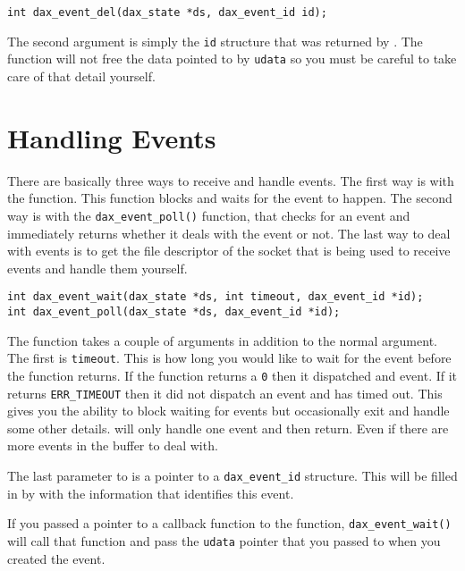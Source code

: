 \begin{verbatim}
int dax_event_del(dax_state *ds, dax_event_id id);
\end{verbatim}

The second argument is simply the \texttt{id} structure that was returned by \eventadd.  The \eventdel function will not free the data pointed to by \texttt{udata} so you must be careful to take care of that detail yourself.

\section{Handling Events}

There are basically three ways to receive and handle events.  The first way is with the \eventwait function.  This function blocks and waits for the event to happen.  The second way is with the \verb|dax_event_poll()| function, that checks for an event and immediately returns whether it deals with the event or not.  The last way to deal with events is to get the file descriptor of the socket that is being used to receive events and handle them yourself.

\begin{verbatim}
int dax_event_wait(dax_state *ds, int timeout, dax_event_id *id);
int dax_event_poll(dax_state *ds, dax_event_id *id);
\end{verbatim}


The \verb|| function takes a couple of arguments in addition to the normal \daxstate argument.  The first is \texttt{timeout}.  This is how long you would like to wait for the event before the function returns.  If the function returns a \verb|0| then it dispatched and event.  If it returns \texttt{ERR\_TIMEOUT} then it did not dispatch an event and has timed out.  This gives you the ability to block waiting for events but occasionally exit and handle some other details.  \eventwait will only handle one event and then return.  Even if there are more events in the buffer to deal with.

The last parameter to \eventwait is a pointer to a \texttt{dax\_event\_id} structure.  This will be filled in by \eventwait with the information that identifies this event.

If you passed a pointer to a callback function to the \eventadd function, \verb|dax_event_wait()| will call that function and pass the \texttt{udata} pointer that you passed to \eventadd when you created the event.  

